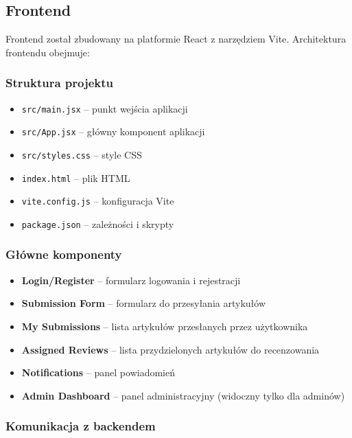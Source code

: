 \documentclass[times]{san}
\begin{document}
\subsection{Frontend}

Frontend został zbudowany na platformie React z narzędziem Vite. Architektura frontendu obejmuje:

\subsubsection{Struktura projektu}

\begin{itemize}
    \item \texttt{src/main.jsx} -- punkt wejścia aplikacji
    \item \texttt{src/App.jsx} -- główny komponent aplikacji
    \item \texttt{src/styles.css} -- style CSS
    \item \texttt{index.html} -- plik HTML
    \item \texttt{vite.config.js} -- konfiguracja Vite
    \item \texttt{package.json} -- zależności i skrypty
\end{itemize}

\subsubsection{Główne komponenty}

\begin{itemize}
    \item \textbf{Login/Register} -- formularz logowania i rejestracji
    \item \textbf{Submission Form} -- formularz do przesyłania artykułów
    \item \textbf{My Submissions} -- lista artykułów przesłanych przez użytkownika
    \item \textbf{Assigned Reviews} -- lista przydzielonych artykułów do recenzowania
    \item \textbf{Notifications} -- panel powiadomień
    \item \textbf{Admin Dashboard} -- panel administracyjny (widoczny tylko dla adminów)
\end{itemize}

\subsubsection{Komunikacja z backendem}
\end{document}
